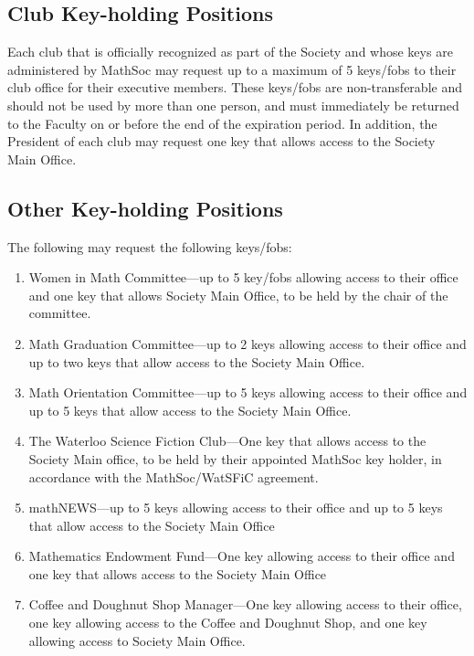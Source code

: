 \subsection{Club Key-holding Positions}
Each club that is officially recognized as part of the Society and whose keys
are administered by MathSoc may request up to a maximum of 5 keys/fobs to their
club office for their executive members. These keys/fobs are non-transferable
and should not be used by more than one person, and must immediately be
returned to the Faculty on or before the end of the expiration period. In
addition, the President of each club may request one key that allows access to
the Society Main Office.

\subsection{Other Key-holding Positions}
The following may request the following keys/fobs:
\begin{enumerate}
  \item Women in Math Committee---up to 5 key/fobs allowing access to their
    office and one key that allows Society Main Office, to be held by the chair
    of the committee.
  \item Math Graduation Committee---up to 2 keys allowing access to their
    office and up to two keys that allow access to the Society Main Office.
  \item Math Orientation Committee---up to 5 keys allowing access to their
    office and up to 5 keys that allow access to the Society Main Office.
  \item The Waterloo Science Fiction Club---One key that allows access to the
    Society Main office, to be held by their appointed MathSoc key holder, in
    accordance with the MathSoc/WatSFiC agreement.
  \item mathNEWS---up to 5 keys allowing access to their office and up to 5
    keys that allow access to the Society Main Office
  \item Mathematics Endowment Fund---One key allowing access to their office
    and one key that allows access to the Society Main Office
  \item Coffee and Doughnut Shop Manager---One key allowing access to their
    office, one key allowing access to the Coffee and Doughnut Shop, and one
    key allowing access to Society Main Office.
\end{enumerate}
